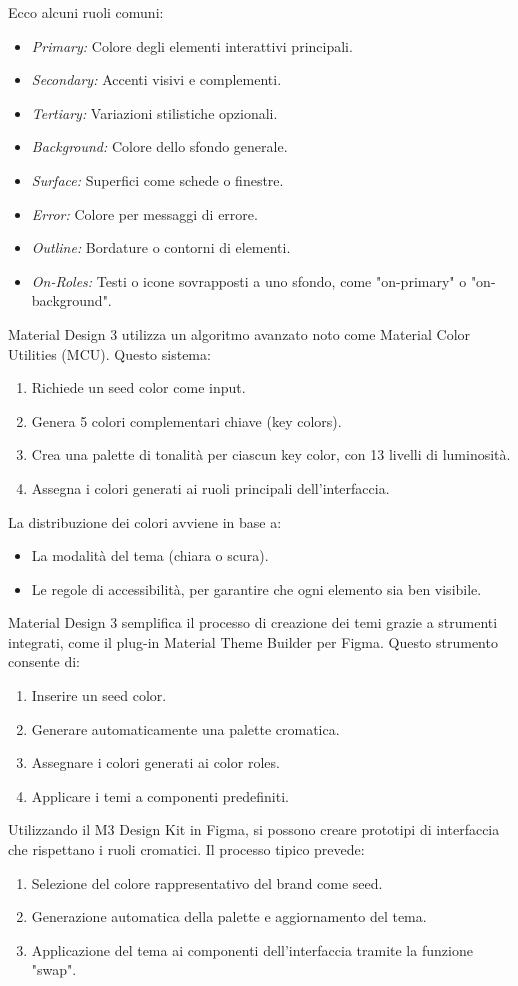 Ecco alcuni ruoli comuni:
\begin{itemize}
    \item \textit{Primary:} Colore degli elementi interattivi principali.
    \item \textit{Secondary:} Accenti visivi e complementi.
    \item \textit{Tertiary:} Variazioni stilistiche opzionali.
    \item \textit{Background:} Colore dello sfondo generale.
    \item \textit{Surface:} Superfici come schede o finestre.
    \item \textit{Error:} Colore per messaggi di errore.
    \item \textit{Outline:} Bordature o contorni di elementi.
    \item \textit{On-Roles:} Testi o icone sovrapposti a uno sfondo, come "on-primary" o "on-background".
\end{itemize}
Material Design 3 utilizza un algoritmo avanzato noto come Material Color Utilities (MCU). Questo sistema:
\begin{enumerate}
    \item Richiede un seed color come input.
    \item Genera 5 colori complementari chiave (key colors).
    \item Crea una palette di tonalità per ciascun key color, con 13 livelli di luminosità.
    \item Assegna i colori generati ai ruoli principali dell'interfaccia.
\end{enumerate}
La distribuzione dei colori avviene in base a:
\begin{itemize}
    \item La modalità del tema (chiara o scura).
    \item Le regole di accessibilità, per garantire che ogni elemento sia ben visibile.
\end{itemize}
Material Design 3 semplifica il processo di creazione dei temi grazie a strumenti integrati, come il plug-in Material Theme Builder per Figma. Questo strumento consente di:
\begin{enumerate}
    \item Inserire un seed color.
    \item Generare automaticamente una palette cromatica.
    \item Assegnare i colori generati ai color roles.
    \item Applicare i temi a componenti predefiniti.
\end{enumerate}
Utilizzando il M3 Design Kit in Figma, si possono creare prototipi di interfaccia che rispettano i ruoli cromatici. Il processo tipico prevede:
\begin{enumerate}
    \item Selezione del colore rappresentativo del brand come seed.
    \item Generazione automatica della palette e aggiornamento del tema.
    \item Applicazione del tema ai componenti dell'interfaccia tramite la funzione "swap".
\end{enumerate}

